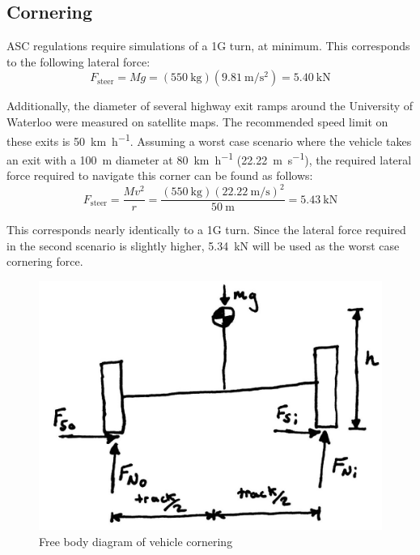 \documentclass[10pt]{article}
\begin{document}
\subsection{Cornering}
ASC regulations require simulations of a 1G turn, at minimum. This corresponds to the following lateral force:
\begin{equation}
F_\mathrm{steer} = Mg = (\SI{550}{\kilo\gram})(\SI{9.81}{\metre\per\second\squared}) = \SI{5.40}{\kilo\newton}
\end{equation}

Additionally, the diameter of several highway exit ramps around the University of Waterloo were measured on satellite maps. The recommended speed limit on these exits is \SI{50}{\kilo\metre\per\hour}. Assuming a worst case scenario where the vehicle takes an exit with a \SI{100}{\metre} diameter at \SI{80}{\kilo\metre\per\hour} (\SI{22.22}{\metre\per\second}), the required lateral force required to navigate this corner can be found as follows: 
\begin{equation}
F_\mathrm{steer} = \frac{Mv^2}{r} = \frac{(\SI{550}{\kilo\gram})(\SI{22.22}{\metre\per\second})^2}{\SI{50}{\metre}} = \SI{5.43}{\kilo\newton}
\end{equation}

This corresponds nearly identically to a 1G turn. Since the lateral force required in the second scenario is slightly higher, \SI{5.34}{\kilo\newton} will be used as the worst case cornering force.

\begin{figure}[hbp]
\centering
\includegraphics[width=.5\textwidth]{figures/cornering-fbd.jpg}
\caption{Free body diagram of vehicle cornering}
\label{fig:cornering-fbd}
\end{figure}
\end{document}
